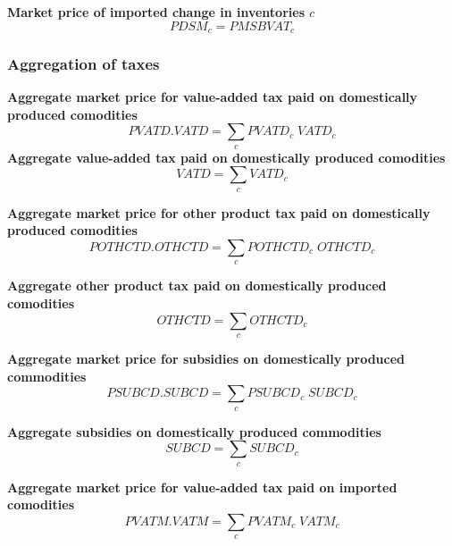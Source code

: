 \documentclass[12pt]{article}
\numberwithin{equation}{section}
\begin{document}
\noindent \textbf{Market price of imported change in inventories $c$} 
\begin{dmath}
PDSM_{c} = PMSBVAT_{c}
\label{Exception_taxes_prices.mdlPDSM[c]}
\end{dmath}




\subsubsection{Aggregation of taxes}



\noindent \textbf{Aggregate market price for value-added tax paid on domestically produced comodities} 
\begin{dmath}
PVATD . VATD = \sum_{c} PVATD_{c} \; VATD_{c}
\label{Exception_taxes_prices.mdlPVATD}
\end{dmath}
\noindent \textbf{Aggregate value-added tax paid on domestically produced comodities} 
\begin{dmath}
VATD = \sum_{c} VATD_{c}
\label{Exception_taxes_prices.mdlVATD}
\end{dmath}

\noindent \textbf{Aggregate market price for other product tax paid on domestically produced comodities} 
\begin{dmath}
POTHCTD . OTHCTD = \sum_{c} POTHCTD_{c} \; OTHCTD_{c}
\label{Exception_taxes_prices.mdlPOTHCTD}
\end{dmath}

\noindent \textbf{Aggregate other product tax paid on domestically produced comodities} 
\begin{dmath}
OTHCTD = \sum_{c} OTHCTD_{c}
\label{Exception_taxes_prices.mdlOTHCTD}
\end{dmath}

\noindent \textbf{Aggregate market price for subsidies on domestically produced commodities} 
\begin{dmath}
PSUBCD . SUBCD = \sum_{c} PSUBCD_{c} \; SUBCD_{c}
\label{Exception_taxes_prices.mdlPSUBCD}
\end{dmath}

\noindent \textbf{Aggregate subsidies on domestically produced commodities} 
\begin{dmath}
SUBCD = \sum_{c} SUBCD_{c}
\label{Exception_taxes_prices.mdlSUBCD}
\end{dmath}

\noindent \textbf{Aggregate market price for value-added tax paid on imported comodities} 
\begin{dmath}
PVATM . VATM = \sum_{c} PVATM_{c} \; VATM_{c}
\label{Exception_taxes_prices.mdlPVATM}
\end{dmath}
\end{document}
